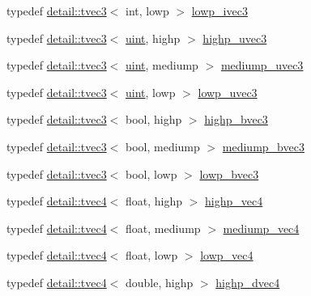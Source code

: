 \begin{DoxyCompactItemize}
\item 
typedef \hyperlink{structglm_1_1detail_1_1tvec3}{detail\+::tvec3}$<$ int, lowp $>$ \hyperlink{group__core__precision_gad133fec5c629e3f712c1270e15144e6c}{lowp\+\_\+ivec3}
\item 
typedef \hyperlink{structglm_1_1detail_1_1tvec3}{detail\+::tvec3}$<$ \hyperlink{group__core__precision_ga4fd29415871152bfb5abd588334147c8}{uint}, highp $>$ \hyperlink{group__core__precision_ga66d0e4ae1742ede2eb32bf0bfedd7474}{highp\+\_\+uvec3}
\item 
typedef \hyperlink{structglm_1_1detail_1_1tvec3}{detail\+::tvec3}$<$ \hyperlink{group__core__precision_ga4fd29415871152bfb5abd588334147c8}{uint}, mediump $>$ \hyperlink{group__core__precision_gaebdefe98b08421ef645f65c706af46b2}{mediump\+\_\+uvec3}
\item 
typedef \hyperlink{structglm_1_1detail_1_1tvec3}{detail\+::tvec3}$<$ \hyperlink{group__core__precision_ga4fd29415871152bfb5abd588334147c8}{uint}, lowp $>$ \hyperlink{group__core__precision_ga26fd88e52fe7003d41b0c57c5edffd6e}{lowp\+\_\+uvec3}
\item 
typedef \hyperlink{structglm_1_1detail_1_1tvec3}{detail\+::tvec3}$<$ bool, highp $>$ \hyperlink{group__core__precision_ga1d77a773fdd024602413670788c10c62}{highp\+\_\+bvec3}
\item 
typedef \hyperlink{structglm_1_1detail_1_1tvec3}{detail\+::tvec3}$<$ bool, mediump $>$ \hyperlink{group__core__precision_gae7c8d0136e829d6fe3feb00856e35f11}{mediump\+\_\+bvec3}
\item 
typedef \hyperlink{structglm_1_1detail_1_1tvec3}{detail\+::tvec3}$<$ bool, lowp $>$ \hyperlink{group__core__precision_ga17ac2986f7b315a2ac4ee2662b5be9cb}{lowp\+\_\+bvec3}
\item 
typedef \hyperlink{structglm_1_1detail_1_1tvec4}{detail\+::tvec4}$<$ float, highp $>$ \hyperlink{group__core__precision_gae32d5f99860247afbe7ed90564bceac1}{highp\+\_\+vec4}
\item 
typedef \hyperlink{structglm_1_1detail_1_1tvec4}{detail\+::tvec4}$<$ float, mediump $>$ \hyperlink{group__core__precision_ga2527a7f322907fecd58bef0a7a9c3ecd}{mediump\+\_\+vec4}
\item 
typedef \hyperlink{structglm_1_1detail_1_1tvec4}{detail\+::tvec4}$<$ float, lowp $>$ \hyperlink{group__core__precision_ga706ad1296c1cdcbd26c815fbb0f3f846}{lowp\+\_\+vec4}
\item 
typedef \hyperlink{structglm_1_1detail_1_1tvec4}{detail\+::tvec4}$<$ double, highp $>$ \hyperlink{group__core__precision_gad5ff5ff4a69e6925f5b4f540e2633835}{highp\+\_\+dvec4}

\end{DoxyCompactItemize}

